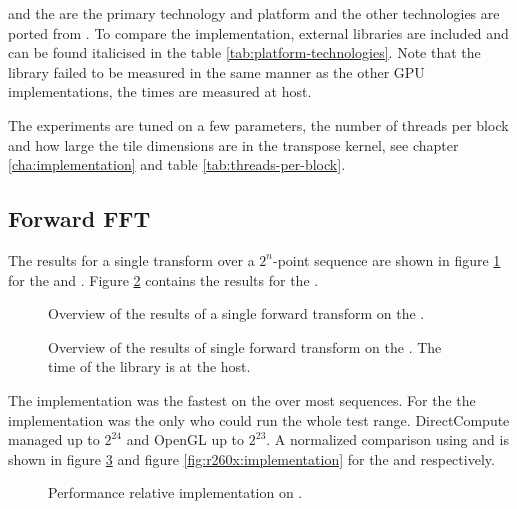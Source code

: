 {\CU} and the {\NVCARD} are the primary technology and platform and the other technologies are ported from {\CU}. To compare the implementation, external libraries are included and can be found italicised in the table \ref{tab:platform-technologies}. Note that the {\CLFFT} library failed to be measured in the same manner as the other GPU implementations, the times are measured at host.

The experiments are tuned on a few parameters, the number of threads per block and how large the tile dimensions are in the transpose kernel, see chapter \ref{cha:implementation} and table \ref{tab:threads-per-block}.

\subsection{Forward FFT}

The results for a single transform over a $2^{n}$-point sequence are shown in figure \ref{fig:gtx:overview} for the {\NVCARD} and {\INTELCPU}. Figure \ref{fig:r260x:overview} contains the results for the {\AMDCARD}.

\begin{figure}\AllPlacementOptions
	\centering
	
	\caption{Overview of the results of a single forward transform on the {\NVCARD}.}
	\label{fig:gtx:overview}
\end{figure}

\begin{figure}[\AllPlacementOptions]
	\centering
	
	\caption{Overview of the results of single forward transform on the {\AMDCARD}. The time of the {\CLFFT} library is at the host.}
	\label{fig:r260x:overview}
\end{figure}

The {\CU} implementation was the fastest on the {\NVCARD} over most sequences. For the {\AMDCARD} the {\OCL} implementation was the only who could run the whole test range. DirectCompute managed up to $2^{24}$ and OpenGL up to $2^{23}$. A normalized comparison using {\CU} and {\OCL} is shown in figure \ref{fig:gtx:implementation} and figure \ref{fig:r260x:implementation} for the {\NVCARD} and {\AMDCARD} respectively.

\begin{figure}[\AllPlacementOptions]
	\centering
	
	\caption{Performance relative {\CU} implementation on {\NVCARD}.}
	\label{fig:gtx:implementation}
\end{figure}

